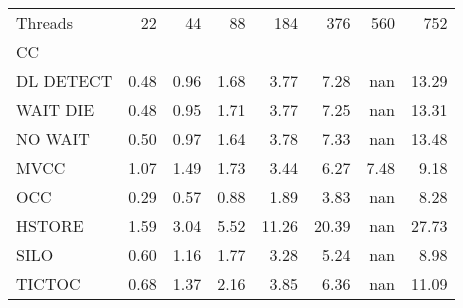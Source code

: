 \begin{tabular}{lrrrrrrr}
\toprule
Threads &  22  &  44  &  88  &   184 &   376 &  560 &   752 \\
CC        &      &      &      &       &       &      &       \\
\midrule
DL DETECT & 0.48 & 0.96 & 1.68 &  3.77 &  7.28 &  nan & 13.29 \\
WAIT DIE  & 0.48 & 0.95 & 1.71 &  3.77 &  7.25 &  nan & 13.31 \\
NO WAIT   & 0.50 & 0.97 & 1.64 &  3.78 &  7.33 &  nan & 13.48 \\
MVCC      & 1.07 & 1.49 & 1.73 &  3.44 &  6.27 & 7.48 &  9.18 \\
OCC       & 0.29 & 0.57 & 0.88 &  1.89 &  3.83 &  nan &  8.28 \\
HSTORE    & 1.59 & 3.04 & 5.52 & 11.26 & 20.39 &  nan & 27.73 \\
SILO      & 0.60 & 1.16 & 1.77 &  3.28 &  5.24 &  nan &  8.98 \\
TICTOC    & 0.68 & 1.37 & 2.16 &  3.85 &  6.36 &  nan & 11.09 \\
\bottomrule
\end{tabular}
